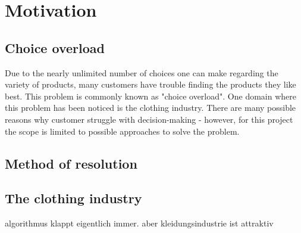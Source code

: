


\section{Motivation}

\subsection{Choice overload}
Due to the nearly unlimited number of choices one can make regarding the variety of products, many customers have trouble finding the products they like best.
This problem is commonly known as "choice overload".\citep[p. 454]{stanton:12}
One domain where this problem has been noticed is the clothing industry.
There are many possible reasons why customer struggle with decision-making\citep[p. 454]{stanton:12} - however, for this project the scope is limited to possible approaches to solve the problem.

\subsection{Method of resolution}

\subsection{The clothing industry}
algorithmus klappt eigentlich immer.
aber kleidungsindustrie ist attraktiv


